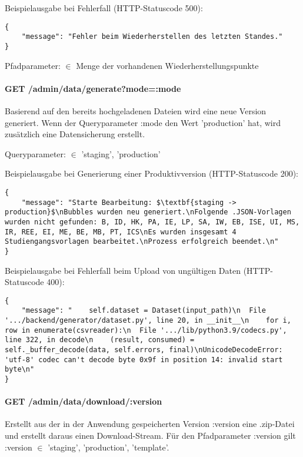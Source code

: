 \noindent
Beispielausgabe bei Fehlerfall (HTTP-Statuscode 500):
\begin{lstlisting}[style=Python]
{
    "message": "Fehler beim Wiederherstellen des letzten Standes."
}
\end{lstlisting}

\noindent
Pfadparameter:  $\in$ Menge der vorhandenen Wiederherstellungspunkte

\paragraph*{GET /admin/data/generate?mode=:mode}
\vspace{-1.0em}
Basierend auf den bereits hochgeladenen Dateien wird eine neue Version generiert. Wenn der Queryparameter :mode den Wert 'production' hat, wird zusätzlich eine Datensicherung erstellt.

\noindent
Queryparameter:  $\in$ {'staging', 'production'}

\noindent
\begin{minipage}{\linewidth}
Beispielausgabe bei Generierung einer Produktivversion (HTTP-Statuscode 200):
\begin{lstlisting}[style=Python, mathescape=true]
{
    "message": "Starte Bearbeitung: $\textbf{staging -> production}$\nBubbles wurden neu generiert.\nFolgende .JSON-Vorlagen wurden nicht gefunden: B, ID, HK, PA, IE, LP, SA, IW, EB, ISE, UI, MS, IR, REE, EI, ME, BE, MB, PT, ICS\nEs wurden insgesamt 4 Studiengangsvorlagen bearbeitet.\nProzess erfolgreich beendet.\n"
}
\end{lstlisting}
\end{minipage}

\noindent
Beispielausgabe bei Fehlerfall beim Upload von ungültigen Daten (HTTP-Statuscode 400):
\begin{lstlisting}[style=Python]
{
    "message": "    self.dataset = Dataset(input_path)\n  File '.../backend/generator/dataset.py', line 20, in __init__\n    for i, row in enumerate(csvreader):\n  File '.../lib/python3.9/codecs.py', line 322, in decode\n    (result, consumed) = self._buffer_decode(data, self.errors, final)\nUnicodeDecodeError: 'utf-8' codec can't decode byte 0x9f in position 14: invalid start byte\n"
}
\end{lstlisting}

\paragraph*{GET /admin/data/download/:version}
\vspace{-1.0em}
Erstellt aus der in der Anwendung gespeicherten Version :version eine .zip-Datei und erstellt daraus einen Download-Stream. Für den Pfadparameter :version gilt :version $\in$ {'staging', 'production', 'template'}.

